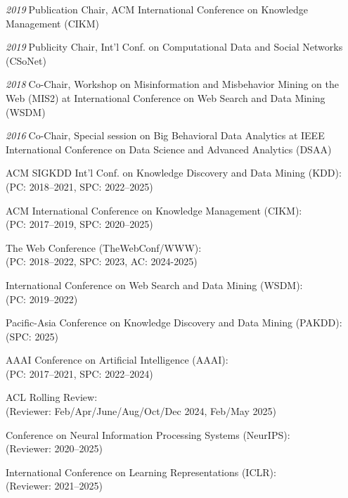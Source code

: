 \documentclass[10pt]{article}
\newenvironment{myindentpar}[1]%
{\begin{list}{}%
         {\setlength{\leftmargin}{#1}}%
         \item[]%
}
{\end{list}}
\newcounter{list}
\begin{document}
\begin{myindentpar}{0.75cm}
{\hspace{-0.75cm}\textit{2019}\textcolor{white}{.}Publication Chair, ACM International Conference on Knowledge Management (CIKM)

\hspace{-0.75cm}\textit{2019}\textcolor{white}{.}Publicity Chair, Int'l Conf. on Computational Data and Social Networks (CSoNet)

\hspace{-0.75cm}\textit{2018}\textcolor{white}{.}Co-Chair, Workshop on Misinformation and Misbehavior Mining on the Web (MIS2) at International Conference on Web Search and Data Mining (WSDM)

\hspace{-0.75cm}\textit{2016}\textcolor{white}{.}Co-Chair, Special session on Big Behavioral Data Analytics at IEEE International Conference on Data Science and Advanced Analytics (DSAA)

}

\hspace{-0.75cm}{\bf (Senior) Program Committee / Reviewer / (Senior) Area Chair}

{\small

ACM SIGKDD Int'l Conf. on Knowledge Discovery and Data Mining (KDD): \\
(PC: 2018--2021, SPC: 2022--2025)

ACM International Conference on Knowledge Management (CIKM): \\
(PC: 2017--2019, SPC: 2020--2025)

The Web Conference (TheWebConf/WWW): \\
(PC: 2018--2022, SPC: 2023, AC: 2024-2025)

International Conference on Web Search and Data Mining (WSDM): \\
(PC: 2019--2022)

Pacific-Asia Conference on Knowledge Discovery and Data Mining (PAKDD): \\
(SPC: 2025)

AAAI Conference on Artificial Intelligence (AAAI): \\
(PC: 2017--2021, SPC: 2022--2024)

ACL Rolling Review: \\
(Reviewer: Feb/Apr/June/Aug/Oct/Dec 2024, Feb/May 2025)

Conference on Neural Information Processing Systems (NeurIPS): \\
(Reviewer: 2020--2025)

International Conference on Learning Representations (ICLR): \\
(Reviewer: 2021--2025)

}
\end{myindentpar}
\end{document}
